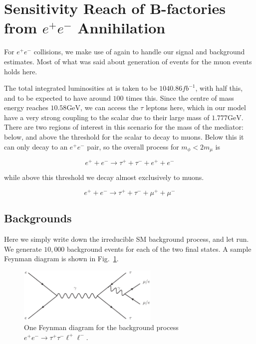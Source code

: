 \section{Sensitivity Reach of B-factories from $e^+ e^-$ Annihilation}
For $e^+ e^-$ collisions, we make use of \madgraph again to handle our signal and background estimates.
Most of what was said about generation of events for the muon events holds here.

The total integrated luminosities at \belle is taken to be $1040.86fb^{-1}$, with \babar half this, and \belletwo to be expected to have around $100$ times this.
Since the centre of mass energy reaches $10.58\textrm{GeV}$, we can access the $\tau$ leptons here, which in our model have a very strong coupling to the scalar due to their large mass of $1.777\textrm{GeV}$.
There are two regions of interest in this scenario for the mass of the mediator: below, and above the threshold for the scalar to decay to muons.
Below this it can only decay to an $e^+ e^-$ pair, so the overall process for $m_\phi < 2m_\mu$ is

\begin{equation}
    e^+ + e^- \rightarrow \tau^+ + \tau^- + e^+ + e^-
\end{equation}

\noindent while above this threshold we decay almost exclusively to muons.

\begin{equation}
    e^+ + e^- \rightarrow \tau^+ + \tau^- + \mu^+ + \mu^-
\end{equation}

\subsection{Backgrounds}
Here we simply write down the irreducible SM background process, and let \madgraph run.
We generate $10,000$ background events for each of the two final states.
A sample Feynman diagram is shown in Fig.\ \ref{fig:ee_tautaull_SM}.

\begin{figure}[h]
    \centering
    \includegraphics[width=0.6\textwidth]{Figures/feynman_diagrams/ee_tautaull_SM}
    \caption{One Feynman diagram for the background process $e^+ e^- \rightarrow \tau^+ \tau^- \ell^+ \ell^-$.}
    \label{fig:ee_tautaull_SM}
\end{figure}

